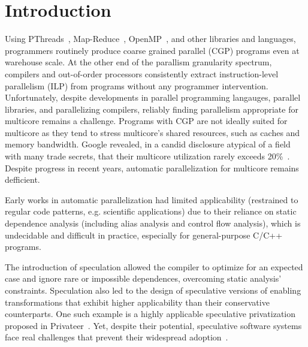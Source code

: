 \section{Introduction}

Using PThreads~\cite{pthread:web}, Map-Reduce~\cite{dean:08:cacm},
OpenMP~\cite{openmp:web}, and other libraries and languages,
programmers routinely produce coarse grained parallel (CGP) programs
even at warehouse scale.  At the other end of the parallism
granularity spectrum, compilers and out-of-order processors
consistently extract instruction-level parallelism (ILP) from programs
without any programmer intervention.  Unfortunately, despite
developments in parallel programming langauges, parallel libraries,
and parallelizing compilers, reliably finding parallelism appropriate
for multicore remains a challenge.  Programs with CGP are not ideally
suited for multicore as they tend to stress multicore's shared
resources, such as caches and memory bandwidth.  Google revealed, in a
candid disclosure atypical of a field with many trade secrets, that
their multicore utilization rarely exceeds
20\%~\cite{barroso:07:computer}.  Despite progress in recent years,
automatic parallelization for multicore remains defficient.

Early works in automatic parallelization had limited applicability
(restrained to regular code patterns, e.g. scientific applications)
due to their reliance on static dependence analysis (including alias
analysis and control flow analysis), which is undecidable and
difficult in practice, especially for general-purpose C/C++ programs.

The introduction of speculation allowed the compiler to optimize for an
expected case and ignore rare or impossible dependences, overcoming static
analysis' constraints.
Speculation also led to the design of speculative versions of enabling
transformations that exhibit higher applicability than their
conservative counterparts.  One such example is a highly applicable
speculative privatization proposed in Privateer~\cite{johnson:12:pldi}.
%
Yet, despite their potential, speculative software systems face real
challenges that prevent their widespread
adoption~\cite{cascaval:08:stmtoy:short, .., ..}.


